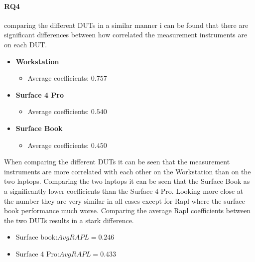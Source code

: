 \paragraph{RQ4}
comparing the different DUTs in a similar manner i can be found that there are significant differences between how correlated the measurement instruments are on each DUT.
\begin{itemize}
    \item \textbf{Workstation}
    \begin{itemize}
        \item Average coefficients: $0.757$%
    \end{itemize}
    \item \textbf{Surface 4 Pro}
    \begin{itemize}
        \item Average coefficients: $0.540$%
    \end{itemize}
    \item \textbf{Surface Book}
    \begin{itemize}
        \item Average coefficients: $0.450$ %
    \end{itemize}
\end{itemize}
When comparing the different DUTs it can be seen that the measurement instruments are more correlated with each other on the Workstation than on the two laptops. Comparing the two laptops it can be seen that the Surface Book as a significantly lower coefficients than the Surface 4 Pro. Looking more close at the number they are very similar in all cases except for Rapl where the surface book performance much worse. Comparing the average Rapl coefficients between the two DUTs results in a stark difference.
\begin{itemize}
    \item Surface book:$AvgRAPL = 0.246$
    \item Surface 4 Pro:$AvgRAPL = 0.433$
\end{itemize}














